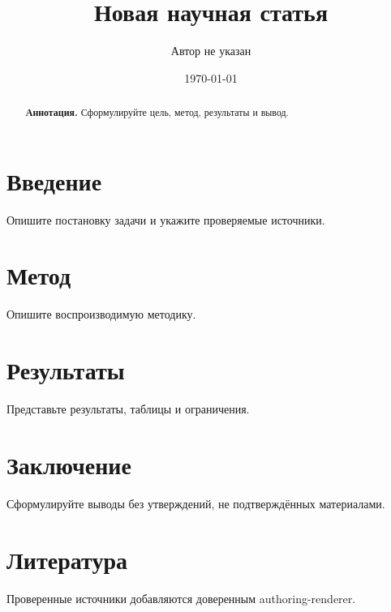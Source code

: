 \documentclass[11pt,a4paper]{article}
\title{Новая научная статья}
\author{Автор не указан}
\date{\today}
\begin{document}
\maketitle
\begin{abstract}\textbf{Аннотация.} Сформулируйте цель, метод, результаты и вывод.\end{abstract}
\section{Введение}
Опишите постановку задачи и укажите проверяемые источники.
\section{Метод}
Опишите воспроизводимую методику.
\section{Результаты}
Представьте результаты, таблицы и ограничения.
\section{Заключение}
Сформулируйте выводы без утверждений, не подтверждённых материалами.
\section*{Литература}
Проверенные источники добавляются доверенным authoring-renderer.
\end{document}
